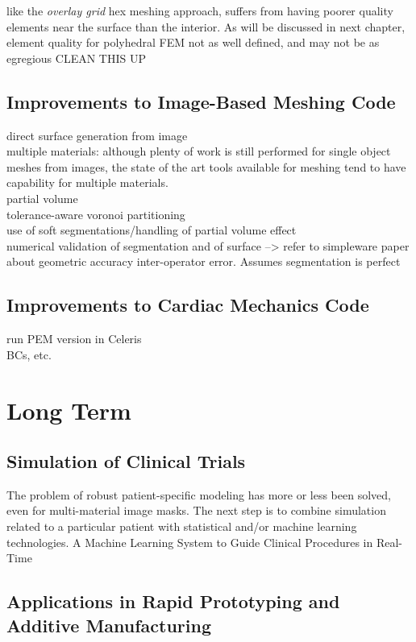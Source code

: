 like the \textit{overlay grid} hex meshing approach, suffers from having poorer quality elements near the surface than the interior. As will be discussed in next chapter, element quality for polyhedral FEM not as well defined, and may not be as egregious
CLEAN THIS UP


\subsection{Improvements to Image-Based Meshing Code}
\label{Improvements to Image-Based Meshing Code}
direct surface generation from image \\
multiple materials: although plenty of work is still performed for single object meshes from images, the state of the art tools available for meshing tend to have capability for multiple materials.  \\
partial volume \\
tolerance-aware voronoi partitioning \\
use of soft segmentations/handling of partial volume effect  \\
numerical validation of segmentation and of surface --> refer to simpleware paper about geometric accuracy
inter-operator error. Assumes segmentation is perfect

\subsection{Improvements to Cardiac Mechanics Code}
\label{Improvements to Cardiac Mechanics Code}
run PEM version in Celeris \\
BCs, etc.

\section{Long Term}
\label{Long Term}

\subsection{Simulation of Clinical Trials}
\label{Simulation of Clinical Trials}
The problem of robust patient-specific modeling has more or less been solved, even for multi-material image masks. The next step is to combine simulation related to a particular patient with statistical and/or machine learning technologies. 
A Machine Learning System to Guide Clinical Procedures in Real-Time

\subsection[Applications in Rapid Prototyping and Additive Manufacturing]{\texorpdfstring{Applications in Rapid Prototyping and Additive \newline Manufacturing}{Applications in Rapid Prototyping and Additive \newline Manufacturing}}
\label{Applications in Rapid Prototyping and Additive Manufacturing}


